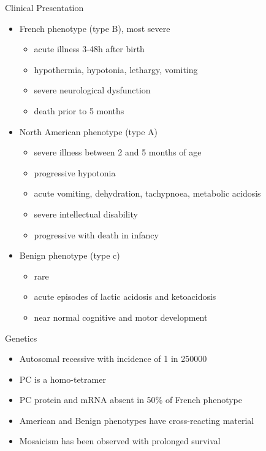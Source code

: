 \documentclass[presentation, smaller]{beamer}
\begin{document}
\begin{frame}[label={sec:org6ff2822}]{Clinical Presentation}
\begin{itemize}
\item French phenotype (type B), most severe
\begin{itemize}
\item acute illness 3-48h after birth
\item hypothermia, hypotonia, lethargy, vomiting
\item severe neurological dysfunction
\item death prior to 5 months
\end{itemize}
\item North American phenotype (type A)
\begin{itemize}
\item severe illness between 2 and 5 months of age
\item progressive hypotonia
\item acute vomiting, dehydration, tachypnoea, metabolic acidosis
\item severe intellectual disability
\item progressive with death in infancy
\end{itemize}
\item Benign phenotype (type c)
\begin{itemize}
\item rare
\item acute episodes of lactic acidosis and ketoacidosis
\item near normal cognitive and motor development
\end{itemize}
\end{itemize}
\end{frame}
\begin{frame}[label={sec:org84ff3a5}]{Genetics}
\begin{itemize}
\item Autosomal recessive with incidence of 1 in 250000
\item PC is a homo-tetramer
\item PC protein and mRNA absent in 50\% of French phenotype
\item American and Benign phenotypes have cross-reacting material
\item Mosaicism has been observed with prolonged survival
\end{itemize}
\end{frame}
\end{document}
